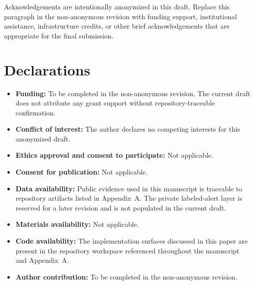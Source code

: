 \documentclass[pdflatex,sn-mathphys-num]{sn-jnl}
\begin{document}

Acknowledgements are intentionally anonymized in this draft. Replace this paragraph in the non-anonymous revision with funding support, institutional assistance, infrastructure credits, or other brief acknowledgements that are appropriate for the final submission.

\section*{Declarations}

\begin{itemize}
  \item \textbf{Funding:} To be completed in the non-anonymous revision. The current draft does not attribute any grant support without repository-traceable confirmation.
  \item \textbf{Conflict of interest:} The author declares no competing interests for this anonymized draft.
  \item \textbf{Ethics approval and consent to participate:} Not applicable.
  \item \textbf{Consent for publication:} Not applicable.
  \item \textbf{Data availability:} Public evidence used in this manuscript is traceable to repository artifacts listed in Appendix~A. The private labeled-alert layer is reserved for a later revision and is not populated in the current draft.
  \item \textbf{Materials availability:} Not applicable.
  \item \textbf{Code availability:} The implementation surfaces discussed in this paper are present in the repository workspace referenced throughout the manuscript and Appendix~A.
  \item \textbf{Author contribution:} To be completed in the non-anonymous revision.
\end{itemize}
\end{document}
